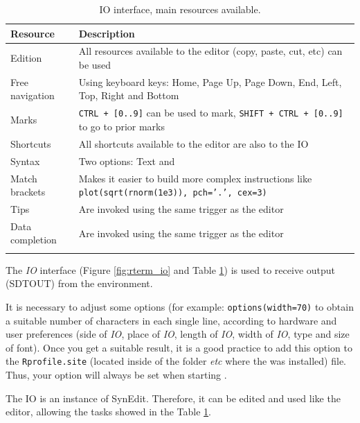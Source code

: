 \begin{table}
  \begin{footnotesize}
    \begin{tabularx}{\textwidth}{>{\hsize=0.3\hsize}X>{\hsize=0.7\hsize}X}\\
      \hline
      \textbf{Resource} & \textbf{Description} \\
      \hline
      Edition & All resources available to the editor (copy, paste, cut, etc) can be used \\
      Free navigation & Using keyboard keys: Home, Page Up, Page Down, End, Left, Top, Right and Bottom \\
      Marks & \texttt{CTRL + [0..9]} can be used to mark, \texttt{SHIFT + CTRL + [0..9]} to go to prior marks \\
      Shortcuts & All shortcuts available to the editor are also to the IO \\
      Syntax & Two options: Text and \RR{} \\
      Match brackets & Makes it easier to build more complex instructions like \texttt{plot(sqrt(rnorm(1e3)), pch='.', cex=3)} \\
      Tips & Are invoked using the same trigger as the editor \\
      Data completion & Are invoked using the same trigger as the editor \\
      \hline
      \\
    \end{tabularx}
  \end{footnotesize}
  \caption{IO interface, main resources available.}
  \label{tab:io_interface}
\end{table}

The \textit{IO} interface
(Figure \ref{fig:rterm_io} and
Table \ref{tab:io_interface})
is used to receive output (SDTOUT) from the \RR{} environment.

It is necessary to adjust some \RR{} options (for example: \texttt{options(width=70)}
to obtain a suitable number of characters in each single line, according to
hardware and user preferences (side of \textit{IO}, place of \textit{IO},
length of \textit{IO}, width of \textit{IO}, type and size of font). Once
you get a suitable result, it is a good practice to add this option to the
\texttt{Rprofile.site} (located inside of the folder \textit{etc} where the
\RR{} was installed) file. Thus, your option will always be set when
starting \RR{}.

The IO is an instance of SynEdit. Therefore, it can be edited and used like
the editor, allowing the tasks showed in the
Table \ref{tab:io_interface}.

